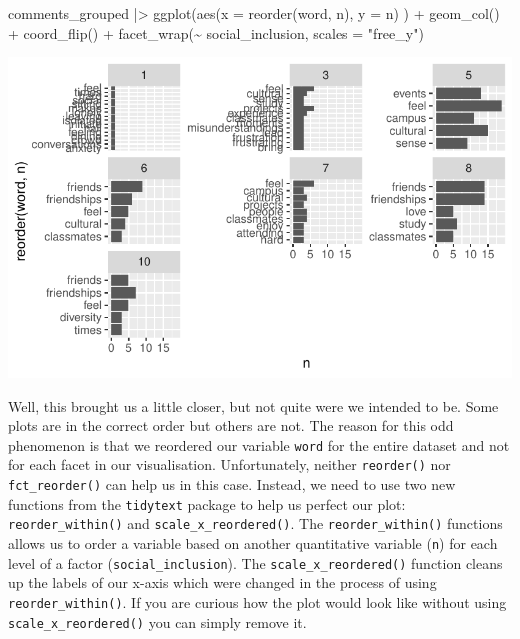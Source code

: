 \documentclass[
  letterpaper,
]{krantz}
\makeatletter
\newenvironment{Shaded}{\begin{snugshade}}{\end{snugshade}}
\newcommand{\AttributeTok}[1]{\textcolor[rgb]{0.40,0.45,0.13}{#1}}
\newcommand{\FunctionTok}[1]{\textcolor[rgb]{0.28,0.35,0.67}{#1}}
\newcommand{\NormalTok}[1]{\textcolor[rgb]{0.00,0.23,0.31}{#1}}
\newcommand{\SpecialCharTok}[1]{\textcolor[rgb]{0.37,0.37,0.37}{#1}}
\newcommand{\StringTok}[1]{\textcolor[rgb]{0.13,0.47,0.30}{#1}}
\newenvironment{kframe}{%
\medskip{}
\setlength{\fboxsep}{.8em}
 \def\at@end@of@kframe{}%
 \ifinner\ifhmode%
  \def\at@end@of@kframe{\end{minipage}}%
  \begin{minipage}{\columnwidth}%
 \fi\fi%
 \def\FrameCommand##1{\hskip\@totalleftmargin \hskip-\fboxsep
 \colorbox{shadecolor}{##1}\hskip-\fboxsep
     \hskip-\linewidth \hskip-\@totalleftmargin \hskip\columnwidth}%
 \MakeFramed {\advance\hsize-\width
   \@totalleftmargin\z@ \linewidth\hsize
   \@setminipage}}%
 {\par\unskip\endMakeFramed%
 \at@end@of@kframe}
\renewenvironment{Shaded}{\begin{kframe}}{\end{kframe}}
\makeatother
\begin{document}
\begin{Shaded}
\begin{Highlighting}[]
\NormalTok{comments\_grouped }\SpecialCharTok{|\textgreater{}}
  \FunctionTok{ggplot}\NormalTok{(}\FunctionTok{aes}\NormalTok{(}\AttributeTok{x =} \FunctionTok{reorder}\NormalTok{(word, n),}
             \AttributeTok{y =}\NormalTok{ n)}
\NormalTok{         ) }\SpecialCharTok{+}
  \FunctionTok{geom\_col}\NormalTok{() }\SpecialCharTok{+}
  \FunctionTok{coord\_flip}\NormalTok{() }\SpecialCharTok{+}
  \FunctionTok{facet\_wrap}\NormalTok{(}\SpecialCharTok{\textasciitilde{}}\NormalTok{ social\_inclusion,}
             \AttributeTok{scales =} \StringTok{"free\_y"}\NormalTok{)}
\end{Highlighting}
\end{Shaded}

\includegraphics{14_mixed_methods_files/figure-pdf/visualise-social-inclusion-groups-words-n-03-1.pdf}

Well, this brought us a little closer, but not quite were we intended to
be. Some plots are in the correct order but others are not. The reason
for this odd phenomenon is that we reordered our variable \texttt{word}
for the entire dataset and not for each facet in our visualisation.
Unfortunately, neither \texttt{reorder()} nor \texttt{fct\_reorder()}
can help us in this case. Instead, we need to use two new functions from
the \texttt{tidytext} package to help us perfect our plot:
\texttt{reorder\_within()} and \texttt{scale\_x\_reordered()}. The
\texttt{reorder\_within()} functions allows us to order a variable based
on another quantitative variable (\texttt{n}) for each level of a factor
(\texttt{social\_inclusion}). The \texttt{scale\_x\_reordered()}
function cleans up the labels of our x-axis which were changed in the
process of using \texttt{reorder\_within()}. If you are curious how the
plot would look like without using \texttt{scale\_x\_reordered()} you
can simply remove it.
\end{document}
